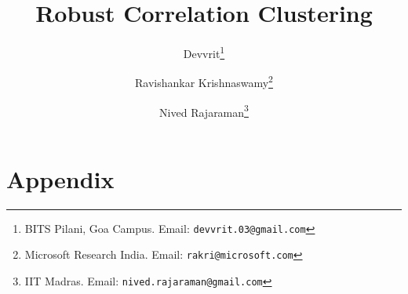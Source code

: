 \documentclass[11pt]{article}
\title{Robust Correlation Clustering}
\author{Devvrit\thanks{BITS Pilani, Goa Campus. Email: {\tt devvrit.03@gmail.com}}
\and Ravishankar Krishnaswamy\thanks{Microsoft Research India. Email: {\tt rakri@microsoft.com}}
\and Nived Rajaraman\thanks{IIT Madras. Email: {\tt nived.rajaraman@gmail.com}}}
\date{}
\begin{document}
\maketitle



\thispagestyle{empty}
\setcounter{page}{0}
\clearpage









\newpage

\section*{Appendix}

\appendix

\newpage
{\small
%

}



%

%

%
%

\end{document}
